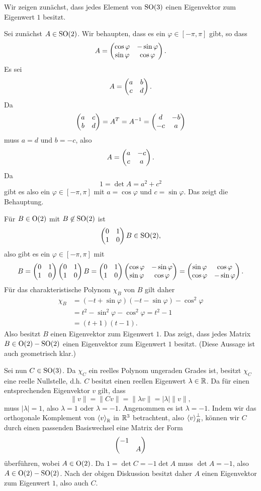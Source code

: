\documentclass[a4paper,10pt]{article}
\begin{document}
\section{}


\subsection{}
Wir zeigen zunächst, dass jedes Element von $\operatorname{SO}(3)$ einen Eigenvektor zum Eigenwert $1$ besitzt.

Sei zunächst $A \in \operatorname{SO}(2)$. Wir behaupten, dass es ein $\varphi \in [-\pi,\pi]$ gibt, so dass
\[
 A = \begin{pmatrix}\cos \varphi & -\sin \varphi \\ \sin \varphi & \cos \varphi\end{pmatrix}.
\]
Es sei
\[
 A = \begin{pmatrix}a & b \\ c & d\end{pmatrix}.
\]
Da
\[
 \begin{pmatrix}a & c \\ b & d\end{pmatrix} = A^T = A^{-1} = \begin{pmatrix}d & -b \\ -c & a\end{pmatrix}
\]
muss $a = d$ und $b = -c$, also
\[
 A= \begin{pmatrix}a & -c \\ c & a\end{pmatrix}.
\]
Da
\[
 1 = \det A = a^2 + c^2
\]
gibt es also ein $\varphi \in [-\pi,\pi]$ mit $a = \cos \varphi$ und $c = \sin \varphi$. Das zeigt die Behauptung.

Für $B \in \operatorname{O}(2)$ mit $B \not\in \operatorname{SO}(2)$ ist
\[
 \begin{pmatrix}0 & 1 \\ 1 & 0\end{pmatrix} B \in \operatorname{SO}(2),
\]
also gibt es ein $\varphi \in [-\pi,\pi]$ mit
\[
 B
 = \begin{pmatrix}0 & 1 \\ 1 & 0\end{pmatrix} \begin{pmatrix}0 & 1 \\ 1 & 0\end{pmatrix} B
 = \begin{pmatrix}0 & 1 \\ 1 & 0\end{pmatrix} \begin{pmatrix}\cos \varphi & -\sin \varphi \\ \sin \varphi & \cos \varphi\end{pmatrix}
 = \begin{pmatrix}\sin \varphi & \cos \varphi \\ \cos \varphi & -\sin \varphi\end{pmatrix}.
\]
Für das charakteristische Polynom $\chi_B$ von $B$ gilt daher
\begin{align*}
 \chi_B
 &= (-t+\sin \varphi)(-t-\sin \varphi)-\cos^2 \varphi \\
 &= t^2 - \sin^2 \varphi - \cos^2 \varphi
 = t^2 - 1 \\
 &= (t+1)(t-1).
\end{align*}
Also besitzt $B$ einen Eigenvektor zum Eigenwert $1$. Das zeigt, dass jedes Matrix $B \in \operatorname{O}(2) - \operatorname{SO}(2)$ einen Eigenvektor zum Eigenwert $1$ besitzt. (Diese Aussage ist auch geometrisch klar.)

Sei nun $C \in \operatorname{SO}(3)$. Da $\chi_C$ ein reelles Polynom ungeraden Grades ist, besitzt $\chi_C$ eine reelle Nullstelle, d.h. $C$ besitzt einen reellen Eigenwert $\lambda \in \mathbb{R}$. Da für einen entsprechenden Eigenvektor $v$ gilt, dass
\[
 \|v\| = \|Cv\| = \|\lambda v \| = |\lambda| \|v\|,
\]
muss $|\lambda| = 1$, also $\lambda = 1$ oder $\lambda = -1$. Angenommen es ist $\lambda = -1$. Indem wir das orthogonale Komplement von $\left\langle v \right\rangle_{\mathbb{R}}$ in $\mathbb{R}^3$ betrachtent, also $\left\langle v \right\rangle_R^\perp$, können wir $C$ durch einen passenden Basiswechsel eine Matrix der Form
\[
 \begin{pmatrix}-1 & \\ & A\end{pmatrix}
\]
überführen, wobei $A \in \operatorname{O}(2)$. Da $1 = \det C = -1 \det A$ muss $\det A = -1$, also $A \in \operatorname{O}(2) - \operatorname{SO}(2)$. Nach der obigen Diskussion besitzt daher $A$ einen Eigenvektor zum Eigenwert $1$, also auch $C$.
\end{document}
